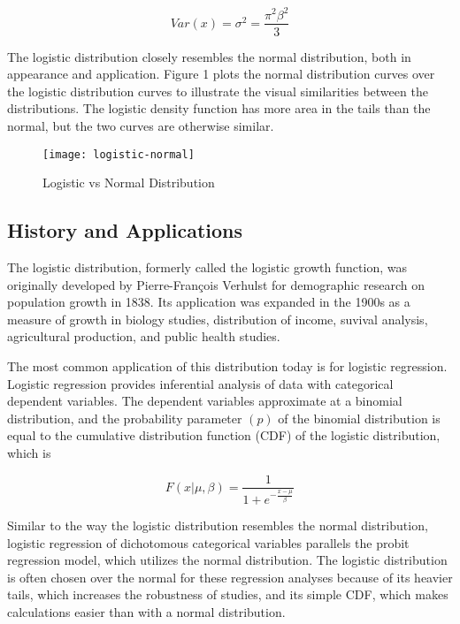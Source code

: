 \documentclass{svproc}
\begin{document}
\begin{equation}
Var(x) = \sigma^2 = \frac{\pi^2 \beta^2}{3}
\label{1.3}
\end{equation}

The logistic distribution closely resembles the normal distribution, both in appearance and application. Figure 1 plots the normal distribution curves over the logistic distribution curves to illustrate the visual similarities between the distributions. The logistic density function has more area in the tails than the normal, but the two curves are otherwise similar.

\begin{figure}
\begin{center}
\caption{Logistic vs Normal Distribution}
\texttt{[image: logistic-normal]}
\label{plot1}
\smallskip
\end{center}
\end{figure}

\smallskip

\subsection{History and Applications}

The logistic distribution, formerly called the logistic growth function, was originally developed by Pierre-François Verhulst for demographic research on population growth in 1838. Its application was expanded in the 1900s as a measure of growth in biology studies, distribution of income, suvival analysis, agricultural production, and public health studies. 

The most common application of this distribution today is for logistic regression. Logistic regression provides inferential analysis of data with categorical dependent variables. The dependent variables approximate at a binomial distribution, and the probability parameter $(p)$ of the binomial distribution is equal to the cumulative distribution function (CDF) of the logistic distribution, which is

\begin{equation}
F(x| \mu,\beta) = \frac{1}{1+e^{-\frac{x-\mu }{\beta }}}
\label{1.4}
\end{equation}

\bigskip

Similar to the way the logistic distribution resembles the normal distribution, logistic regression of dichotomous categorical variables parallels the probit regression model, which utilizes the normal distribution. The logistic distribution is often chosen over the normal for these regression analyses because of its heavier tails, which increases the robustness of studies, and its simple CDF, which makes calculations easier than with a normal distribution.
\end{document}

